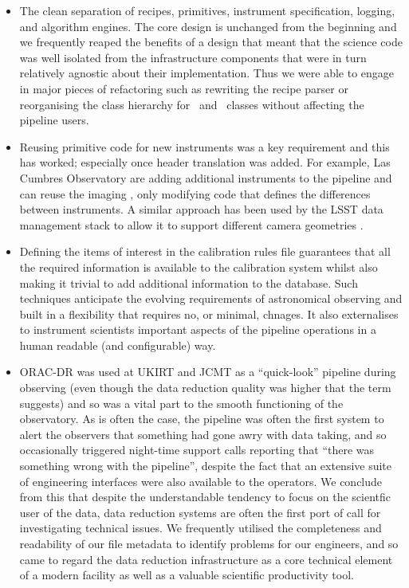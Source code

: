 \documentclass[final,authoryear,5p,times,twocolumn]{elsarticle}
\begin{document}
\begin{itemize}

\item The clean separation of recipes, primitives, instrument
  specification, logging, and algorithm engines. The core design is
  unchanged from the beginning and we frequently reaped the benefits
  of a design that meant that the science code was well isolated from
  the infrastructure components that were in turn relatively agnostic
  about their implementation. Thus we were able to engage in major
  pieces of refactoring such as rewriting the recipe parser or
  reorganising the class hierarchy for \Frame\ and \Group\ classes
  without affecting the pipeline users.

\item Reusing primitive code for new instruments was a key requirement
  and this has worked; especially once header translation was
  added. For example, Las Cumbres Observatory are adding additional
  instruments to the pipeline and can reuse the imaging \primitives,
  only modifying code that defines the differences between
  instruments. A similar approach has been used by the LSST data
  management stack to allow it to support different camera geometries
  \citep{2010SPIE.7740E..15A}.

\item Defining the items of interest in the calibration rules file
  guarantees that all the required information is available to the
  calibration system whilst also making it trivial to add additional
  information to the database. Such techniques anticipate the evolving
  requirements of astronomical observing and built in a flexibility
  that requires no, or minimal, chnages. It also externalises to
  instrument scientists important aspects of the pipeline operations
  in a human readable (and configurable) way. 

\item ORAC-DR was used at UKIRT and JCMT as a ``quick-look'' pipeline
  during observing (even though the data reduction quality was higher
  that the term suggests) and so was a vital part to the smooth
  functioning of the observatory. As is often the case, the pipeline
  was often the first system to alert the observers that something had
  gone awry with data taking, and so occasionally triggered night-time
  support calls reporting that ``there was something wrong with the
  pipeline'', despite the fact that an extensive suite of engineering
  interfaces were also available to the operators. We conclude from
  this that despite the understandable tendency to focus on the
  scientfic user of the data, data reduction systems are often the
  first port of call for investigating technical issues. We frequently
  utilised the completeness and readability of our file metadata to
  identify problems for our engineers, and so came to regard the data
  reduction infrastructure as a core technical element of a modern
  facility as well as a valuable scientific productivity tool.

\end{itemize}
\end{document}
